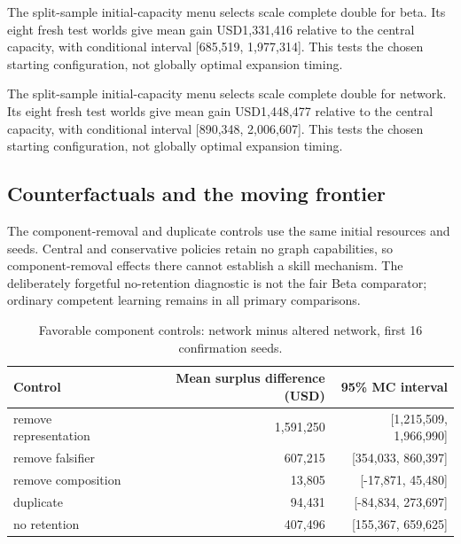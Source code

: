 The split-sample initial-capacity menu selects scale complete double for beta. Its eight fresh test worlds give mean gain USD1,331,416 relative to the central capacity, with conditional interval [685,519, 1,977,314]. This tests the chosen starting configuration, not globally optimal expansion timing.

The split-sample initial-capacity menu selects scale complete double for network. Its eight fresh test worlds give mean gain USD1,448,477 relative to the central capacity, with conditional interval [890,348, 2,006,607]. This tests the chosen starting configuration, not globally optimal expansion timing.

\subsection{Counterfactuals and the moving frontier}

The component-removal and duplicate controls use the same initial resources and seeds. Central and conservative policies retain no graph capabilities, so component-removal effects there cannot establish a skill mechanism. The deliberately forgetful no-retention diagnostic is not the fair Beta comparator; ordinary competent learning remains in all primary comparisons.

\begin{table}[H]\centering\small\caption{Favorable component controls: network minus altered network, first 16 confirmation seeds.}

\begin{tabular}{lrr}\toprule Control & Mean surplus difference (USD) & 95\% MC interval\\\midrule

remove representation & 1,591,250 & [1,215,509, 1,966,990] \\

remove falsifier & 607,215 & [354,033, 860,397] \\

remove composition & 13,805 & [-17,871, 45,480] \\

duplicate & 94,431 & [-84,834, 273,697] \\

no retention & 407,496 & [155,367, 659,625] \\

\bottomrule\end{tabular}\end{table}

